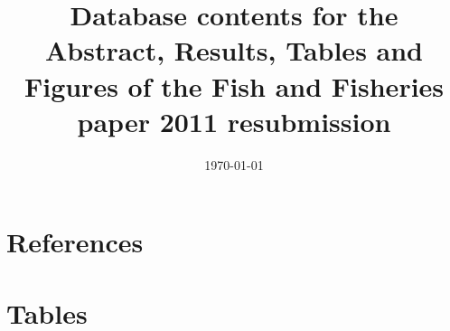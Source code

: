 \documentclass[letterpaper,review,authoryear,12pt]{myelsarticle}
\begin{document}
\begin{frontmatter}
\title{Database contents for the Abstract, Results, Tables and Figures of the Fish and Fisheries paper 2011 resubmission}
\date{\today}
\end{frontmatter}




\section*{References}



\section*{Tables}

\begin{tiny}

\end{tiny}


\end{document}
